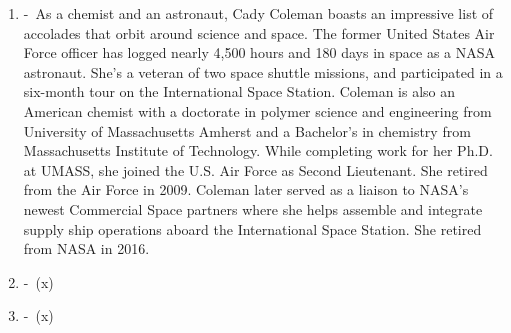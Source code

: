 \documentclass[12pt,a4paper]{article}
\begin{document}
\begin{enumerate}
    \item {} -\ As a chemist and an astronaut, Cady Coleman boasts an impressive list of accolades that orbit around science and space. The former United States Air Force officer has logged nearly 4,500 hours and 180 days in space as a NASA astronaut. She's a veteran of two space shuttle missions, and participated in a six-month tour on the International Space Station. Coleman is also an American chemist with a doctorate in polymer science and engineering from University of Massachusetts Amherst and a Bachelor's in chemistry from Massachusetts Institute of Technology. While completing work for her Ph.D. at UMASS, she joined the U.S. Air Force as Second Lieutenant. She retired from the Air Force in 2009. Coleman later served as a liaison to NASA's newest Commercial Space partners where she helps assemble and integrate supply ship operations aboard the International Space Station. She retired from NASA in 2016.
    \item {} -\ (x) %
    \item {} -\ (x) %
  \end{enumerate}
\end{document}
